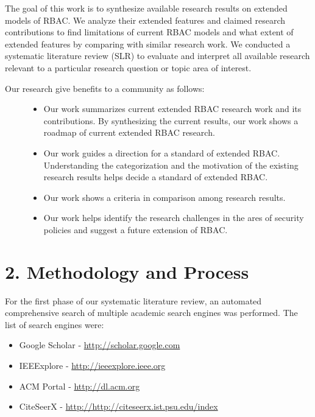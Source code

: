 \documentclass[letterpaper,10pt,english]{sphinxmanual}
\begin{document}
The goal of this work is to synthesize available research results on extended models of RBAC. We analyze their extended features and claimed research contributions to find limitations of current RBAC models and what extent of extended features by
comparing with similar research work.
We conducted a systematic literature review (SLR) to evaluate and interpret all available research relevant to a particular research question or topic area of interest.
\begin{description}
\item[{Our research give benefits to a community as follows:}] \leavevmode\begin{itemize}
\item {} 
Our work summarizes current extended RBAC research work and its contributions. By synthesizing the current results, our work shows a roadmap of current extended RBAC research.

\item {} 
Our work guides a direction for a standard of extended RBAC. Understanding the categorization and the motivation of the existing research results helps decide a standard of extended RBAC.

\item {} 
Our work shows a criteria in comparison among research results.

\item {} 
Our work helps identify the research challenges in the ares of security policies and suggest a future extension of RBAC.

\end{itemize}

\end{description}




\chapter{2. Methodology and Process}
\label{process:methodology-and-process}\label{process::doc}
For the first phase of our systematic literature review, an automated comprehensive search of multiple academic search engines was performed. The list of search engines were:
\begin{itemize}
\item {} 
Google Scholar - \href{http://scholar.google.com}{http://scholar.google.com}

\item {} 
IEEExplore     - \href{http://ieeexplore.ieee.org}{http://ieeexplore.ieee.org}

\item {} 
ACM Portal     - \href{http://dl.acm.org}{http://dl.acm.org}

\item {} 
CiteSeerX      - \href{http://http://citeseerx.ist.psu.edu/index}{http://http://citeseerx.ist.psu.edu/index}

\end{itemize}
\end{document}
